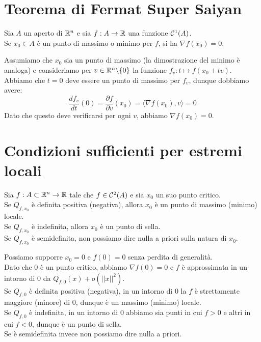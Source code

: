 \documentclass[openany]{book}
\begin{document}
\section{Teorema di Fermat Super Saiyan}

\begin{theorem}{}{}
    Sia $A$ un aperto di $\mathbb{R}^n$ e sia $f:A\to\mathbb{R}$ una funzione $\mathcal{C}^1(A)$.\\
    Se $x_0 \in A$ è un punto di massimo o minimo per $f$, si ha $\nabla f(x_0) = 0$.
\end{theorem}

    Assumiamo che $x_0$ sia un punto di massimo (la dimostrazione del minimo è analoga) e consideriamo per $v \in \mathbb{R}^n\backslash \{0\}$ la funzione $f_v : t\mapsto f(x_0 + tv)$.\\
    Abbiamo che $t=0$ deve essere un punto di massimo per $f_v$, dunque dobbiamo avere:
    \[\frac{df_v}{dt}(0) = \frac{\partial f}{\partial v}(x_0)=\langle\nabla f(x_0), v\rangle=0\]
    Dato che questo deve verificarsi per ogni $v$, abbiamo $\nabla f(x_0) = 0$.


\section{Condizioni sufficienti per estremi locali}

\begin{theorem}{}{}
    Sia $f : A \subset \mathbb{R}^n\to\mathbb{R}$ tale che $f \in \mathcal{C}^2(A)$ e sia $x_0$ un suo punto critico.\\
    Se $Q_{f,x_0}$ è definita positiva (negativa), allora $x_0$ è un punto di massimo (minimo) locale.\\
    Se $Q_{f,x_0}$ è indefinita, allora $x_0$ è un punto di sella.\\
    Se $Q_{f,x_0}$ è semidefinita, non possiamo dire nulla a priori sulla natura di $x_0$.
\end{theorem}

    Possiamo supporre $x_0 = 0$ e $f(0) = 0$ senza perdita di generalità.\\
    Dato che $0$ è un punto critico, abbiamo $\nabla f(0) = 0$ e $f$ è approssimata in un intorno di $0$ da $Q_{f,0}(x)+o(||x||^2)$.\\
    Se $Q_{f,0}$ è definita positiva (negativa), in un intorno di $0$ la $f$ è strettamente maggiore (minore) di $0$, dunque è un massimo (minimo) locale.\\
    Se $Q_{f,0}$ è indefinita, in un intorno di $0$ abbiamo sia punti in cui $f>0$ e altri in cui $f<0$, dunque è un punto di sella.\\
    Se è semidefinita invece non possiamo dire nulla a priori.
\end{document}
